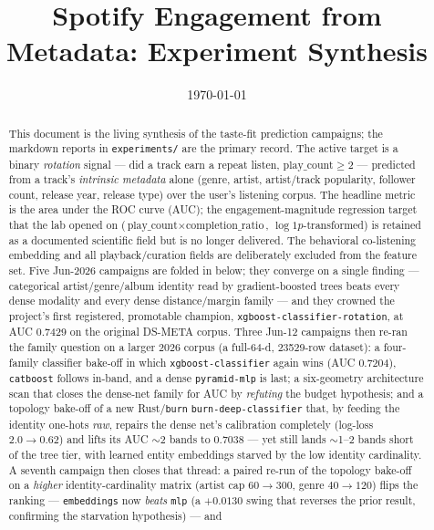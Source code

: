 \documentclass[11pt]{article}
\title{Spotify Engagement from Metadata: Experiment Synthesis}
\author{}
\date{\today}
\begin{document}
\maketitle

\begin{abstract}
This document is the living synthesis of the taste-fit prediction campaigns;
the markdown reports in \texttt{experiments/} are the primary record. The
active target is a binary \emph{rotation} signal --- did a track earn a repeat
listen, $\text{play\_count}\ge 2$ --- predicted from a track's \emph{intrinsic
metadata} alone (genre, artist, artist/track popularity, follower count,
release year, release type) over the user's listening corpus. The headline
metric is the area under the ROC curve (AUC); the engagement-magnitude
regression target that the lab opened on ($\text{play\_count}\times
\text{completion\_ratio}$, $\log1p$-transformed) is retained as a documented
scientific field but is no longer delivered. The behavioral co-listening
embedding and all playback/curation fields are deliberately excluded from the
feature set. Five Jun-2026 campaigns are folded in below; they converge on a
single finding --- categorical artist/genre/album identity read by
gradient-boosted trees beats every dense modality and every dense
distance/margin family --- and they crowned the project's first registered,
promotable champion, \texttt{xgboost-classifier-rotation}, at AUC
\num{0.7429} on the original DS-META corpus. Three Jun-12 campaigns then
re-ran the family question on a larger 2026 corpus (a full-64-d,
\num{23529}-row dataset): a four-family classifier bake-off in which
\texttt{xgboost-classifier} again wins (AUC \num{0.7204}), \texttt{catboost}
follows in-band, and a dense \texttt{pyramid-mlp} is last; a six-geometry
architecture scan that closes the dense-net family for AUC by \emph{refuting}
the budget hypothesis; and a topology bake-off of a new Rust/\texttt{burn}
\texttt{burn-deep-classifier} that, by feeding the identity one-hots
\emph{raw}, repairs the dense net's calibration completely (log-loss
$2.0\to 0.62$) and lifts its AUC $\sim$2 bands to \num{0.7038} --- yet still
lands $\sim$1--2 bands short of the tree tier, with learned entity embeddings
starved by the low identity cardinality. A seventh campaign then closes that
thread: a paired re-run of the topology bake-off on a \emph{higher}
identity-cardinality matrix (artist cap $60\to300$, genre $40\to120$) flips the
ranking --- \texttt{embeddings} now \emph{beats} \texttt{mlp} (a $+0.0130$ swing
that reverses the prior result, confirming the starvation hypothesis) --- and

\end{abstract}
\end{document}
